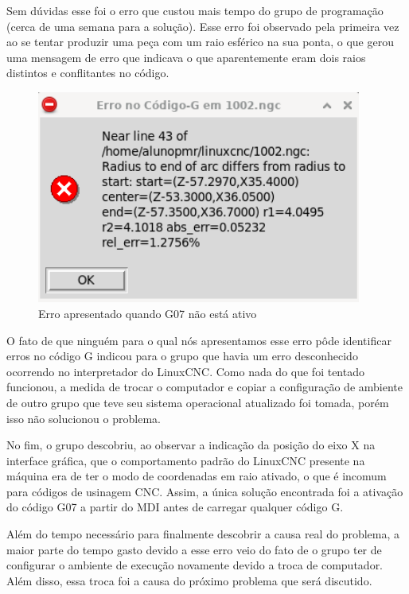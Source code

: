 Sem dúvidas esse foi o erro que custou mais tempo do grupo de programação (cerca de uma semana para a solução). Esse erro foi observado pela primeira vez ao se tentar produzir uma peça com um raio esférico na sua ponta, o que gerou uma mensagem de erro que indicava o que aparentemente eram dois raios distintos e conflitantes no código.

\begin{figure}[H]
    \begin{center}
        \includegraphics[width=0.95\textwidth]{images/prog/erro_g7.png}
    \end{center}
    \caption{Erro apresentado quando G07 não está ativo}\label{g07}
\end{figure}

O fato de que ninguém para o qual nós apresentamos esse erro pôde identificar erros no código G indicou para o grupo que havia um erro desconhecido ocorrendo no interpretador do LinuxCNC. Como nada do que foi tentado funcionou, a medida de trocar o computador e copiar a configuração de ambiente de outro grupo que teve seu sistema operacional atualizado foi tomada, porém isso não solucionou o problema. 

No fim, o grupo descobriu, ao observar a indicação da posição do eixo X na interface gráfica, que o comportamento padrão do LinuxCNC presente na máquina era de ter o modo de coordenadas em raio ativado, o que é incomum para códigos de usinagem CNC. Assim, a única solução encontrada foi a ativação do código G07 a partir do MDI antes de carregar qualquer código G. 

Além do tempo necessário para finalmente descobrir a causa real do problema, a maior parte do tempo gasto devido a esse erro veio do fato de o grupo ter de configurar o ambiente de execução novamente devido a troca de computador. Além disso, essa troca foi a causa do próximo problema que será discutido. 

